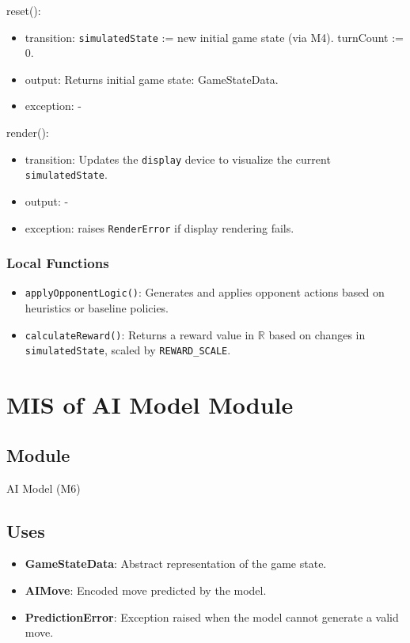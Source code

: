 \documentclass[12pt, titlepage]{article}
\begin{document}
\noindent reset():
\begin{itemize}
\item transition:  
      \texttt{simulatedState} := new initial game state (via M4).  
      turnCount := 0.
\item output:  
      Returns initial game state: GameStateData.
\item exception: -
\end{itemize}

\noindent render():
\begin{itemize}
\item transition:  
      Updates the \texttt{display} device to visualize the current \texttt{simulatedState}.
\item output: -
\item exception: raises \texttt{RenderError} if display rendering fails.
\end{itemize}

\subsubsection{Local Functions}
\begin{itemize}
\item \texttt{applyOpponentLogic()}: Generates and applies opponent actions based on heuristics or baseline policies.
\item \texttt{calculateReward()}: Returns a reward value in $\mathbb{R}$ based on changes in \texttt{simulatedState}, scaled by \texttt{REWARD\_SCALE}.
\end{itemize}

\section{MIS of AI Model Module} \label{M6}

\subsection{Module}
AI Model (M6)

\subsection{Uses}

\begin{itemize}
    \item \textbf{GameStateData}: Abstract representation of the game state.
    \item \textbf{AIMove}: Encoded move predicted by the model.
    \item \textbf{PredictionError}: Exception raised when the model cannot generate a valid move.
\end{itemize}
\end{document}

